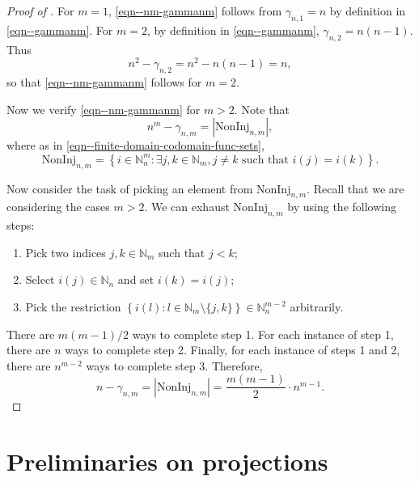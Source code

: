 \documentclass[12pt]{article}
\numberwithin{equation}{section}
\theoremstyle{definition}
\theoremstyle{plain}
\begin{document}
\begin{proof}[Proof of ]
For \(m = 1\), \eqref{eqn--nm-gammanm} follows from \(\gamma_{n, 1} = n\) by
definition in \eqref{eqn--gammanm}.
For \(m = 2\), by definition in \eqref{eqn--gammanm},
\(\gamma_{n, 2} = n (n - 1)\).
Thus
\begin{equation*}
  n^{2} - \gamma_{n, 2} = n^{2} - n (n - 1) = n,
\end{equation*}
so that \eqref{eqn--nm-gammanm} follows for \(m = 2\).

Now we verify \eqref{eqn--nm-gammanm} for \(m > 2\).
Note that
\begin{equation*}
  n^{m} - \gamma_{n, m} = \left| \mathrm{NonInj}_{n, m} \right|,
\end{equation*}
where as in \eqref{eqn--finite-domain-codomain-func-sets},
\begin{equation*}
  \mathrm{NonInj}_{n, m} = \left\{ i \in \mathbb{N}_{n}^{m} : \exists j, k
  \in \mathbb{N}_{m}, j \neq k \text{ such that } i (j) = i
  (k) \right\}.
\end{equation*}

Now consider the task of picking an element from \(\mathrm{NonInj}_{n, m}\).
Recall that we are considering the cases \(m > 2\).
We can exhaust \(\mathrm{NonInj}_{n, m}\) by using the following steps:
\begin{enumerate}
  \item Pick two indices \(j, k \in \mathbb{N}_{m}\) such that \(j
    < k\);
  \item Select \(i (j) \in \mathbb{N}_{n}\) and set \(i (k) = i
    (j)\);
  \item Pick the restriction \(\left\{ i (l) : l \in \mathbb{N}_{m} \setminus
    \{j, k\} \right\} \in \mathbb{N}_{n}^{m - 2}\) arbitrarily.
\end{enumerate}
There are \(m (m - 1) / 2\) ways to complete step 1.
For each instance of step 1, there are \(n\) ways to complete step 2.
Finally, for each instance of steps 1 and 2, there are \(n^{m - 2}\) ways to
complete step 3.
Therefore,
\begin{equation*}
  n - \gamma_{n, m} = \left| \mathrm{NonInj}_{n, m} \right| = \frac{m (m -
  1)}{2} \cdot n^{m - 1}.
\end{equation*}
\end{proof}

\printbibliography

\newpage

\appendix

\section{Preliminaries on projections}
\end{document}
